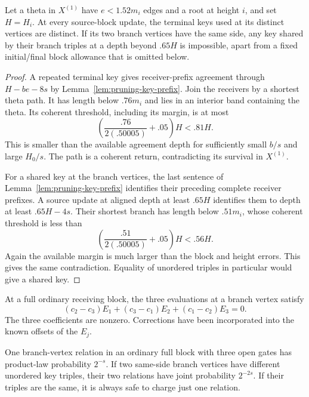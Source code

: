 \begin{lemma}
\label{lem:pruning-theta-keys}
Let a theta in $X^{(1)}$ have $e<1.52m_i$ edges and a root at
height $i$, and set $H=H_i$. At every source-block update, the terminal
keys used at its distinct vertices are distinct. If its two branch
vertices have the same side, any key shared by their branch
triples at a depth beyond $.65H$ is impossible, apart from a
fixed initial/final block allowance that is omitted below.
\end{lemma}

\begin{proof}
A repeated terminal key gives receiver-prefix agreement through
$H-be-8s$ by Lemma~\ref{lem:pruning-key-prefix}.  Join the
receivers by a shortest theta path.  It has length below $.76m_i$
and lies in an interior band containing the theta.  Its coherent
threshold, including its margin, is at most
\[
 \left(\frac{.76}{2(.50005)}+.05\right)H
 <.81H.
\]
This is smaller than the available agreement depth for sufficiently
small $b/s$ and large $H_0/s$.  The path is a coherent return,
contradicting its survival in $X^{(1)}$.

For a shared key at the branch vertices, the last sentence of
Lemma~\ref{lem:pruning-key-prefix} identifies their preceding
complete receiver prefixes.  A source update at aligned depth
at least $.65H$ identifies them to depth at least $.65H-4s$.
Their shortest branch has length below $.51m_i$, whose coherent
threshold is less than
\[
 \left(\frac{.51}{2(.50005)}+.05\right)H<.56H.
\]
Again the available margin is much larger than the block and
height errors.  This gives the same contradiction.  Equality
of unordered triples in particular would give a shared key.
\end{proof}

At a full ordinary receiving block, the three evaluations at a branch vertex
satisfy
\begin{equation}
\label{eq:pruning-triple-relation}
 (c_2-c_3)E_1+(c_3-c_1)E_2+(c_1-c_2)E_3=0.
\end{equation}
The three coefficients are nonzero.  Corrections have been
incorporated into the known offsets of the $E_j$.

\begin{lemma}
\label{lem:pruning-triple-ranks}
One branch-vertex relation in an ordinary full block with three open
gates has product-law probability $2^{-s}$.  If two same-side
branch vertices have different unordered key triples, their two
relations have joint probability $2^{-2s}$.  If their triples
are the same, it is always safe to charge just one relation.
\end{lemma}

